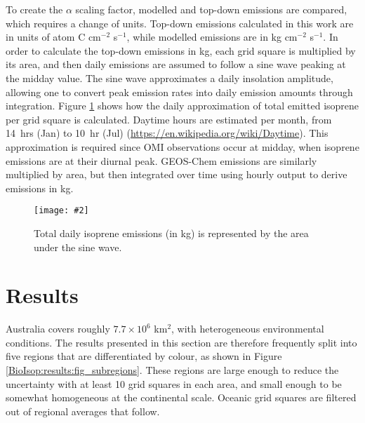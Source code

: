 \documentclass[acp, manuscript]{copernicus}
\newcommand{\mypicw}[4]{
  \begin{figure}
    \centering
    \captionsetup{width=#1}
    \texttt{[image: \#2]}
    \caption{#3}
    #4
  \end{figure}
}
\begin{document}
    \label{BioIsop:method:conversion_to_kg}
    To create the $\alpha$ scaling factor, modelled and top-down emissions are compared, which requires a change of units.
    Top-down emissions calculated in this work are in units of atom C cm$^{-2}$ s$^{-1}$, while modelled emissions are in kg cm$^{-2}$ s$^{-1}$.
    In order to calculate the top-down emissions in kg, each grid square is multiplied by its area, and then daily emissions are assumed to follow a sine wave peaking at the midday value.
    The sine wave approximates a daily insolation amplitude, allowing one to convert peak emission rates into daily emission amounts through integration.
    Figure \ref{BioIsop:method:conversion_to_kg:fig_daily_emissions_kg} shows how the daily approximation of total emitted isoprene per grid square is calculated.
    Daytime hours are estimated per month, from 14~hrs (Jan) to 10~hr (Jul) (\url{https://en.wikipedia.org/wiki/Daytime}).
    This approximation is required since OMI observations occur at midday, when isoprene emissions are at their diurnal peak.
    GEOS-Chem emissions are similarly multiplied by area, but then integrated over time using hourly output to derive emissions in kg.
    
    \mypicw{0.5\textwidth}{Figures/Emissions_per_day.png}{%
      Total daily isoprene emissions (in kg) is represented by the area under the sine wave.
    }{\label{BioIsop:method:conversion_to_kg:fig_daily_emissions_kg}}
    
\section{Results}
  \label{BioIsop:results}
  
  Australia covers roughly $7.7 \times 10^6$ km$^{2}$, with heterogeneous environmental conditions.
  The results presented in this section are therefore frequently split into five regions that are differentiated by colour, as shown in Figure \ref{BioIsop:results:fig_subregions}.
  These regions are large enough to reduce the uncertainty with at least 10 grid squares in each area, and small enough to be somewhat homogeneous at the continental scale.
  Oceanic grid squares are filtered out of regional averages that follow.
  
\end{document}
